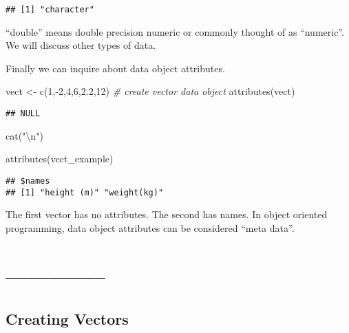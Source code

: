 \documentclass[
]{article}
\newenvironment{Shaded}{\begin{snugshade}}{\end{snugshade}}
\newcommand{\CommentTok}[1]{\textcolor[rgb]{0.56,0.35,0.01}{\textit{#1}}}
\newcommand{\DecValTok}[1]{\textcolor[rgb]{0.00,0.00,0.81}{#1}}
\newcommand{\FloatTok}[1]{\textcolor[rgb]{0.00,0.00,0.81}{#1}}
\newcommand{\FunctionTok}[1]{\textcolor[rgb]{0.00,0.00,0.00}{#1}}
\newcommand{\NormalTok}[1]{#1}
\newcommand{\OtherTok}[1]{\textcolor[rgb]{0.56,0.35,0.01}{#1}}
\newcommand{\SpecialCharTok}[1]{\textcolor[rgb]{0.00,0.00,0.00}{#1}}
\newcommand{\StringTok}[1]{\textcolor[rgb]{0.31,0.60,0.02}{#1}}
\begin{document}
\begin{verbatim}
## [1] "character"
\end{verbatim}

``double'' means double precision numeric or commonly thought of as
``numeric''. We will discuss other types of data.

Finally we can inquire about data object attributes.

\begin{Shaded}
\begin{Highlighting}[]
\NormalTok{vect }\OtherTok{\textless{}{-}} \FunctionTok{c}\NormalTok{(}\DecValTok{1}\NormalTok{,}\SpecialCharTok{{-}}\DecValTok{2}\NormalTok{,}\DecValTok{4}\NormalTok{,}\DecValTok{6}\NormalTok{,}\FloatTok{2.2}\NormalTok{,}\DecValTok{12}\NormalTok{) }\CommentTok{\# create vector data object}
\FunctionTok{attributes}\NormalTok{(vect)}
\end{Highlighting}
\end{Shaded}

\begin{verbatim}
## NULL
\end{verbatim}

\begin{Shaded}
\begin{Highlighting}[]
\FunctionTok{cat}\NormalTok{(}\StringTok{"}\SpecialCharTok{\textbackslash{}n}\StringTok{"}\NormalTok{)}
\end{Highlighting}
\end{Shaded}

\begin{Shaded}
\begin{Highlighting}[]
\FunctionTok{attributes}\NormalTok{(vect\_example)}
\end{Highlighting}
\end{Shaded}

\begin{verbatim}
## $names
## [1] "height (m)" "weight(kg)"
\end{verbatim}

The first vector has no attributes. The second has names. In object
oriented programming, data object attributes can be considered ``meta
data''.

\hypertarget{section-20}{%
\section{--------------}\label{section-20}}

\hypertarget{creating-vectors}{%
\subsection{Creating Vectors}\label{creating-vectors}}
\end{document}
